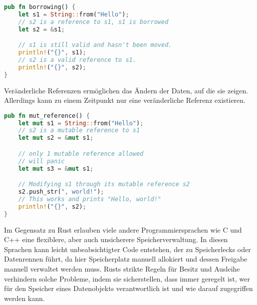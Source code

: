 \begin{lstlisting}[language=Rust, caption=Unveränderliche Ausleihe]
pub fn borrowing() {
    let s1 = String::from("Hello");
    // s2 is a reference to s1, s1 is borrowed
    let s2 = &s1;  

    // s1 is still valid and hasn't been moved.
    println!("{}", s1); 
    // s2 is a valid reference to s1.
    println!("{}", s2); 
}
\end{lstlisting}
\noindent
Veränderliche Referenzen ermöglichen das Ändern der Daten, auf die sie zeigen. Allerdings kann zu einem Zeitpunkt nur eine veränderliche Referenz existieren.

\begin{lstlisting}[language=Rust, caption=Veränderliche Referenz]
pub fn mut_reference() {
    let mut s1 = String::from("Hello");
    // s2 is a mutable reference to s1
    let mut s2 = &mut s1;  

    // only 1 mutable reference allowed
    // will panic
    let mut s3 = &mut s1;

    // Modifying s1 through its mutable reference s2
    s2.push_str(", world!"); 
    // This works and prints "Hello, world!"
    println!("{}", s2); 
}
\end{lstlisting}
\noindent
Im Gegensatz zu Rust erlauben viele andere Programmiersprachen wie C und C++ eine flexiblere, aber auch unsicherere Speicherverwaltung. 
In diesen Sprachen kann leicht unbeabsichtigter Code entstehen, der zu Speicherlecks oder Datenrennen führt, da hier Speicherplatz manuell allokiert und dessen Freigabe manuell verwaltet werden muss. Rusts strikte Regeln für Besitz und Ausleihe verhindern solche Probleme, indem sie sicherstellen, dass immer geregelt ist, wer für den Speicher eines Datenobjekts verantwortlich ist und wie darauf zugegriffen werden kann.

